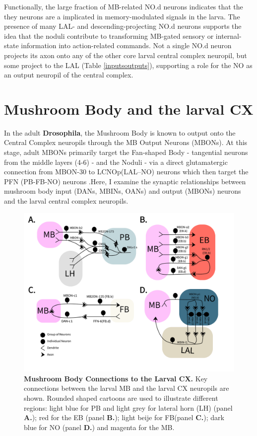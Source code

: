     Functionally, the large fraction of MB-related NO.d neurons indicates that the they neurons are a implicated in memory-modulated signals in the larva. The presence of many LAL- and descending-projecting NO.d neurons supports the idea that the noduli contribute to transforming MB-gated sensory or internal-state information into action-related commands.
    Not a single NO.d neuron projects its axon onto any of the other core larval central complex neuropil, but some project to the LAL (Table \ref{inputsoutputs}), supporting a role for the NO as an output neuropil of the central complex.

\section{Mushroom Body and the larval CX}
    \label{CXMB}
    In the adult \textbf{Drosophila}, the Mushroom Body is known to output onto the Central Complex neuropils through the MB Output Neurons (MBONs). At this stage, adult MBONs primarily target the Fan-shaped Body - tangential neurons from the middle layers (4-6) - and the Noduli - via a direct glutamatergic connection from MBON-30 to LCNOp(LAL–NO) neurons which then target the PFN (PB-FB-NO) neurons \citep{hulse2021connectome}.Here, I examine the synaptic relationships between mushroom body input (DANs, MBINs, OANs) and output (MBONs) neurons and the larval central complex neuropils. 
        
    \begin{figure}
        \centering
        \includegraphics[width=17cm]{Figs/CX/MBtoCX.pdf}
        \caption[Mushroom Body Connections to the Larval CX]{\textbf{Mushroom Body Connections to the Larval CX.} Key connections between the larval MB and the larval CX neuropils are shown. Rounded shaped cartoons are used to illustrate different regions: light blue for PB and light grey for lateral horn (LH) (panel \textbf{A.}); red for the EB (panel \textbf{B.}); light beije for FB(panel \textbf {C.}); dark blue for NO (panel \textbf{D.}) and magenta for the MB. }
        \label{MBtoCX}
    \end{figure}
    
